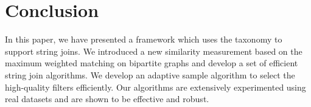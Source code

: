 \section{Conclusion}

In this paper, we have presented a framework which uses the taxonomy to support string joins. We introduced a new similarity measurement based on the maximum weighted matching on bipartite graphs and develop a set of efficient string join algorithms. We develop an adaptive sample algorithm to select the high-quality filters efficiently. Our algorithms are extensively experimented using real datasets and are shown to be effective and robust.
